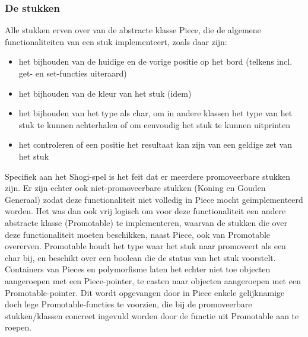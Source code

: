 \documentclass[a4paper,11pt,oneside, titlepage]{article}
\begin{document}
\subsubsection{De stukken}
Alle stukken erven over van de abstracte klasse Piece, die de algemene functionaliteiten van een stuk implementeert, zoals daar zijn: 
	\begin{itemize}
		\item het bijhouden van de huidige en de vorige positie op het bord (telkens incl. get- en set-functies uiteraard)
		\item het bijhouden van de kleur van het stuk (idem)
		\item het bijhouden van het type als char, om in andere klassen het type van het stuk te kunnen achterhalen of om eenvoudig het stuk te kunnen uitprinten
		\item het controleren of een positie het resultaat kan zijn van een geldige zet van het stuk
 	\end{itemize}
Specifiek aan het Shogi-spel is het feit dat er meerdere promoveerbare stukken zijn. Er zijn echter ook niet-promoveerbare stukken (Koning en Gouden Generaal) zodat deze functionaliteit niet volledig in Piece mocht ge\"implementeerd worden. Het was dan ook vrij logisch om voor deze functionaliteit een andere abstracte klasse (Promotable) te implementeren, waarvan de stukken die over deze functionaliteit moeten beschikken, naast Piece, ook van Promotable overerven. Promotable houdt het type waar het stuk naar promoveert als een char bij, en beschikt over een boolean die de status van het stuk voorstelt. Containers van Pieces en polymorfisme laten het echter niet toe objecten aangeroepen met een Piece-pointer, te casten naar objecten aangeroepen met een Promotable-pointer. Dit wordt opgevangen door in Piece enkele gelijknamige doch lege Promotable-functies te voorzien, die bij de promoveerbare stukken/klassen concreet ingevuld worden door de functie uit Promotable aan te roepen.
\end{document}
